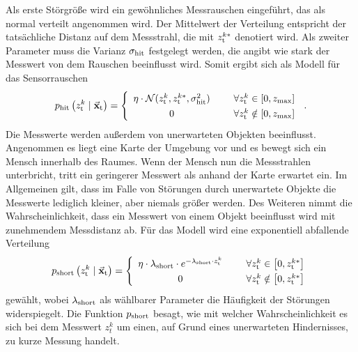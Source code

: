 Als erste Störgröße wird ein gewöhnliches Messrauschen eingeführt, das als normal verteilt angenommen wird. Der Mittelwert der Verteilung entspricht der tatsächliche Distanz auf dem Messstrahl, die mit $z^{k*}_{\text{t}}$ denotiert wird. Als zweiter Parameter muss die Varianz $\sigma_{\text{hit}}$ festgelegt werden, die angibt wie stark der Messwert von dem Rauschen beeinflusst wird. Somit ergibt sich als Modell für das Sensorrauschen
\begin{equation}
p\idx{hit}\left( z^{k}\idx{t} \mCond \mVec{x}\idx{t} \right) = \left\{ \begin{array}{cl}
\eta \cdot \mathcal{N}(z^k\idx{t}, z^{k*}\idx{t}, \sigma^2\idx{hit}) & \hspace{5mm}\forall z^k\idx{t} \in \left[0, z\idx{max}\right] \\
0 & \hspace{5mm} \forall z^k\idx{t} \notin \left[0, z\idx{max}\right]
\end{array}\right. \,.
\end{equation}
Die Messwerte werden außerdem von unerwarteten Objekten beeinflusst. Angenommen es liegt eine Karte der Umgebung vor und es bewegt sich ein Mensch innerhalb des Raumes. Wenn der Mensch nun die Messstrahlen unterbricht, tritt ein geringerer Messwert als anhand der Karte erwartet ein. Im Allgemeinen gilt, dass im Falle von Störungen durch unerwartete Objekte die Messwerte lediglich kleiner, aber niemals größer werden. Des Weiteren nimmt die Wahrscheinlichkeit, dass ein Messwert von einem Objekt beeinflusst wird mit zunehmendem Messdistanz ab. Für das Modell wird eine exponentiell abfallende Verteilung
\begin{equation}
\renewcommand*{\arraystretch}{1.3}
p\idx{short}\left( z^k\idx{t} \mCond \mVec{x}\idx{t} \right) = \left\{ \begin{array}{cl}
\eta \cdot \lambda\idx{short}\cdot e^{-\lambda\idx{short}\cdot z^{k}\idx{t}} & \hspace{5mm} \forall z^{k}\idx{t} \in \left[0, z^{k*}\idx{t}\right] \\
0 & \hspace{5mm} \forall z^{k}\idx{t} \notin \left[0, z^{k*}\idx{t}\right]
\end{array}\right. 
\end{equation}
gewählt, wobei $\lambda_{\text{short}}$ als wählbarer Parameter die Häufigkeit der Störungen widerspiegelt. Die Funktion $p_{\text{short}}$ besagt, wie mit welcher Wahrscheinlichkeit es sich bei dem Messwert $z^k_t$ um einen, auf Grund eines unerwarteten Hindernisses, zu kurze Messung handelt.

